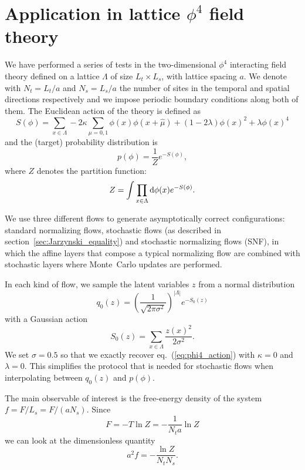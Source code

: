 \documentclass[11pt]{article}
\newcommand{\dd}{{\rm{d}}}
\begin{document}
\section{Application in lattice $\phi^4$ field theory}
\label{sec:phi4_results}

We have performed a series of tests in the two-dimensional $\phi^4$ interacting field theory defined on a lattice $\Lambda$ of size $L_t \times L_s$, with lattice spacing $a$. We denote with $N_t=L_t/a$ and $N_s=L_s/a$ the number of sites in the temporal and spatial directions respectively and we impose periodic boundary conditions along both of them. The Euclidean action of the theory is defined as
\begin{equation}
\label{eq:phi4_action}
 S(\phi) = \sum_{x \in \Lambda} - 2 \kappa \sum_{\mu=0,1} \phi(x)\phi(x+\hat{\mu}) + (1 - 2\lambda) \phi(x)^2 + \lambda \phi(x)^4
\end{equation}
and the (target) probability distribution is
\begin{equation}
 p(\phi) = \frac{1}{Z} e^{-S(\phi)},
\end{equation}
where $Z$ denotes the partition function:
\begin{equation}
 Z = \int \prod_{x \in \Lambda} \dd \phi(x) e^{-S(\phi)}.
\end{equation}

We use three different flows to generate asymptotically correct configurations: standard normalizing flows, stochastic flows (as described in section~\ref{sec:Jarzynski_equality}) and stochastic normalizing flows (SNF), in which the affine layers that compose a typical normalizing flow are combined with stochastic layers where Monte~Carlo updates are performed.

In each kind of flow, we sample the latent variables $z$ from a normal distribution
\begin{equation}
 q_0(z) =  \left (\frac{1}{\sqrt{2 \pi \sigma^2}} \right)^{\left| \Lambda \right|} e^{-S_0(z)}
\end{equation}
with a Gaussian action
\begin{equation}
\label{eq:gauss_action}
 S_0(z) = \sum_{x \in \Lambda} \frac{z(x)^2}{2 \sigma^2}.
\end{equation}
We set $\sigma=0.5$ so that we exactly recover eq.~(\ref{eq:phi4_action}) with $\kappa=0$ and $\lambda=0$. This simplifies the protocol that is needed for stochastic flows when interpolating between $q_0(z)$ and $p(\phi)$.

The main observable of interest is the free-energy density of the system $f= F/L_s = F / (aN_s)$. Since
\begin{equation}
F = - T \ln Z = - \frac{1}{N_t a} \ln Z
\end{equation}
we can look at the dimensionless quantity
\begin{equation}
a^2 f = - \frac{\ln Z}{N_t N_s}.
\end{equation}
\end{document}

